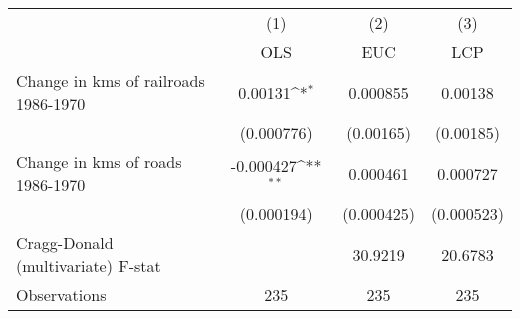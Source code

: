 {
\def\sym#1{\ifmmode^{#1}\else\(^{#1}\)\fi}
\begin{tabular}{l*{3}{c}}
\hline\hline
                &\multicolumn{1}{c}{(1)}&\multicolumn{1}{c}{(2)}&\multicolumn{1}{c}{(3)}\\
                &\multicolumn{1}{c}{OLS}&\multicolumn{1}{c}{EUC}&\multicolumn{1}{c}{LCP}\\
\hline
Change in kms of railroads 1986-1970&  0.00131\sym{*}  & 0.000855         &  0.00138         \\
                &(0.000776)         &(0.00165)         &(0.00185)         \\
[1em]
Change in kms of roads 1986-1970&-0.000427\sym{**} & 0.000461         & 0.000727         \\
                &(0.000194)         &(0.000425)         &(0.000523)         \\
\hline
Cragg-Donald (multivariate) F-stat&                  &  30.9219         &  20.6783         \\
Observations    &      235         &      235         &      235         \\
\hline\hline
\end{tabular}
}
